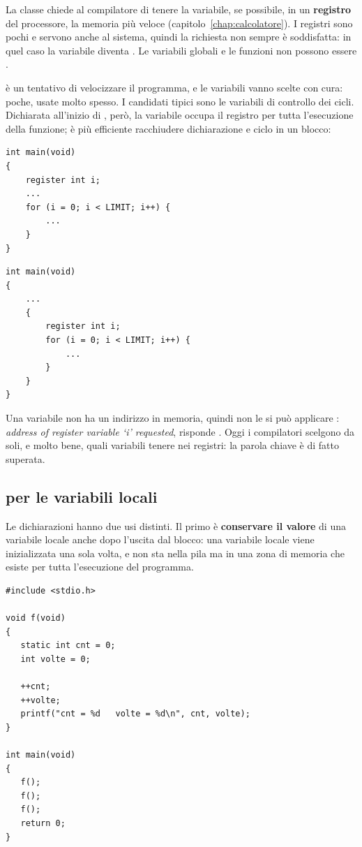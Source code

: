 La classe  chiede al compilatore di tenere la variabile, se
possibile, in un \textbf{registro} del processore, la memoria più veloce
(capitolo~\ref{chap:calcolatore}). I registri sono pochi e servono anche al
sistema, quindi la richiesta non sempre è soddisfatta: in quel caso la
variabile diventa . Le variabili globali e le funzioni non
possono essere .

 è un tentativo di velocizzare il programma, e le variabili
vanno scelte con cura: poche, usate molto spesso. I candidati tipici sono
le variabili di controllo dei cicli. Dichiarata all'inizio di ,
però, la variabile occupa il registro per tutta l'esecuzione della
funzione; è più efficiente racchiudere dichiarazione e ciclo in un blocco:

\begin{affianco}[0.5][c]
\begin{lstlisting}[style=c]
int main(void)
{
    register int i;
    ...
    for (i = 0; i < LIMIT; i++) {
        ...
    }
}
\end{lstlisting}
\risultato
\begin{lstlisting}[style=c]
int main(void)
{
    ...
    {
        register int i;
        for (i = 0; i < LIMIT; i++) {
            ...
        }
    }
}
\end{lstlisting}
\end{affianco}

Una variabile  non ha un indirizzo in memoria, quindi non le
si può applicare \code{\&}: \textit{address of register variable ‘i’
requested}, risponde . Oggi i compilatori scelgono da soli, e
molto bene, quali variabili tenere nei registri: la parola chiave
 è di fatto superata.

\subsection{ per le variabili locali}

Le dichiarazioni  hanno due usi distinti. Il primo è
\textbf{conservare il valore} di una variabile locale anche dopo l'uscita
dal blocco: una variabile locale  viene inizializzata una sola
volta, e non sta nella pila ma in una zona di memoria che esiste per tutta
l'esecuzione del programma.

\begin{affianco}[0.5][c]
\begin{lstlisting}[style=c, name=statica.c]
#include <stdio.h>

void f(void)
{
   static int cnt = 0;
   int volte = 0;

   ++cnt;
   ++volte;
   printf("cnt = %d   volte = %d\n", cnt, volte);
}

int main(void)
{
   f();
   f();
   f();
   return 0;
}
\end{lstlisting}
\risultato
{}
\end{affianco}

